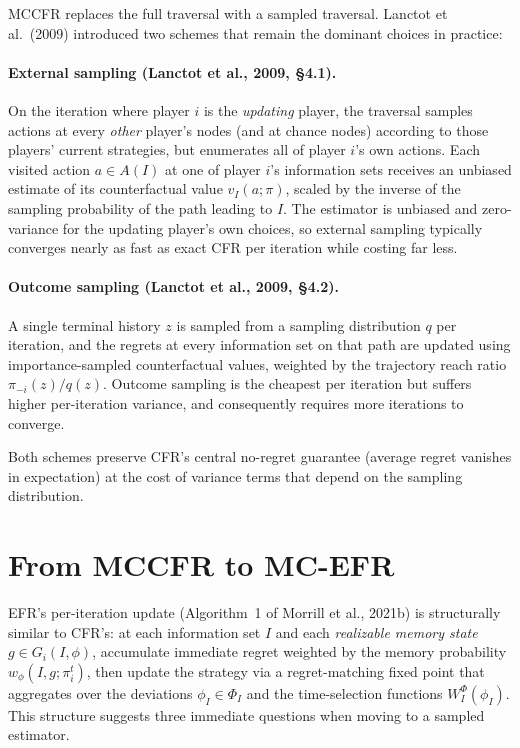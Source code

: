\documentclass[11pt]{article}
\begin{document}
MCCFR replaces the full traversal with a sampled traversal. Lanctot et al.\ (2009) introduced two schemes that remain the dominant choices in practice:

\paragraph{External sampling (Lanctot et al., 2009, \S4.1).} On the iteration where player $i$ is the \emph{updating} player, the traversal samples actions at every \emph{other} player's nodes (and at chance nodes) according to those players' current strategies, but enumerates all of player $i$'s own actions. Each visited action $a \in A(I)$ at one of player $i$'s information sets receives an unbiased estimate of its counterfactual value $v_I(a;\pi)$, scaled by the inverse of the sampling probability of the path leading to $I$. The estimator is unbiased and zero-variance for the updating player's own choices, so external sampling typically converges nearly as fast as exact CFR per iteration while costing far less.

\paragraph{Outcome sampling (Lanctot et al., 2009, \S4.2).} A single terminal history $z$ is sampled from a sampling distribution $q$ per iteration, and the regrets at every information set on that path are updated using importance-sampled counterfactual values, weighted by the trajectory reach ratio $\pi_{-i}(z)/q(z)$. Outcome sampling is the cheapest per iteration but suffers higher per-iteration variance, and consequently requires more iterations to converge.

Both schemes preserve CFR's central no-regret guarantee (average regret vanishes in expectation) at the cost of variance terms that depend on the sampling distribution.

\section{From MCCFR to MC-EFR}
\label{sec:mcefr_derivation}

EFR's per-iteration update (Algorithm~1 of Morrill et al., 2021b) is structurally similar to CFR's: at each information set $I$ and each \emph{realizable memory state} $g \in G_i(I,\phi)$, accumulate immediate regret weighted by the memory probability $w_\phi(I,g;\pi_i^t)$, then update the strategy via a regret-matching fixed point that aggregates over the deviations $\phi_I \in \Phi_I$ and the time-selection functions $W_I^\Phi(\phi_I)$. This structure suggests three immediate questions when moving to a sampled estimator.
\end{document}
